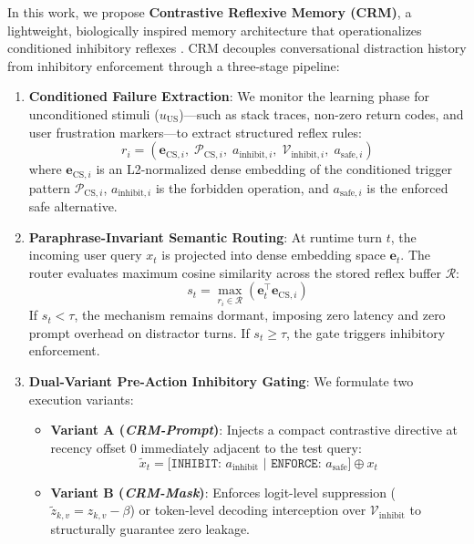 \documentclass[10pt,conference]{IEEEtran}
\begin{document}
In this work, we propose \textbf{Contrastive Reflexive Memory (CRM)}, a lightweight, biologically inspired memory architecture that operationalizes conditioned inhibitory reflexes \citep{pavlov1927conditioned,rescorla1972theory}. CRM decouples conversational distraction history from inhibitory enforcement through a three-stage pipeline:
\begin{enumerate}
    \item \textbf{Conditioned Failure Extraction}: We monitor the learning phase for unconditioned stimuli ($u_{\text{US}}$)---such as stack traces, non-zero return codes, and user frustration markers---to extract structured reflex rules:
    \begin{equation}
        r_i = \left(\mathbf{e}_{\text{CS}, i},\; \mathcal{P}_{\text{CS}, i},\; a_{\text{inhibit}, i},\; \mathcal{V}_{\text{inhibit}, i},\; a_{\text{safe}, i}\right)
    \end{equation}
    where $\mathbf{e}_{\text{CS}, i}$ is an L2-normalized dense embedding of the conditioned trigger pattern $\mathcal{P}_{\text{CS}, i}$, $a_{\text{inhibit}, i}$ is the forbidden operation, and $a_{\text{safe}, i}$ is the enforced safe alternative.
    
    \item \textbf{Paraphrase-Invariant Semantic Routing}: At runtime turn $t$, the incoming user query $x_t$ is projected into dense embedding space $\mathbf{e}_t$. The router evaluates maximum cosine similarity across the stored reflex buffer $\mathcal{R}$:
    \begin{equation}
        s_t = \max_{r_i \in \mathcal{R}} \left(\mathbf{e}_t^\top \mathbf{e}_{\text{CS}, i}\right)
    \end{equation}
    If $s_t < \tau$, the mechanism remains dormant, imposing zero latency and zero prompt overhead on distractor turns. If $s_t \ge \tau$, the gate triggers inhibitory enforcement.
    
    \item \textbf{Dual-Variant Pre-Action Inhibitory Gating}: We formulate two execution variants:
    \begin{itemize}
        \item \textbf{Variant A (\textit{CRM-Prompt})}: Injects a compact contrastive directive at recency offset 0 immediately adjacent to the test query:
        \begin{equation}
            \tilde{x}_t = \texttt{[INHIBIT: } a_{\text{inhibit}} \texttt{ | ENFORCE: } a_{\text{safe}} \texttt{]} \oplus x_t
        \end{equation}
        \item \textbf{Variant B (\textit{CRM-Mask})}: Enforces logit-level suppression ($\tilde{z}_{k,v} = z_{k,v} - \beta$) or token-level decoding interception over $\mathcal{V}_{\text{inhibit}}$ to structurally guarantee zero leakage.
    \end{itemize}
\end{enumerate}
\end{document}
